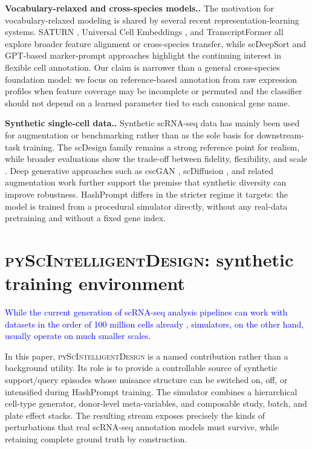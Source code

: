 \documentclass{article}
\newcommand{\myparagraph}[1]{\noindent\textbf{#1.} }
\newcommand{\phflo}[1]{\textcolor{blue}{#1}}
\begin{document}
\myparagraph{Vocabulary-relaxed and cross-species models.}
The motivation for vocabulary-relaxed modeling is shared by several recent representation-learning systems. SATURN \cite{saturn}, Universal Cell Embeddings \cite{uce}, and TranscriptFormer \cite{transcriptformer} all explore broader feature alignment or cross-species transfer, while scDeepSort \cite{shao2021scdeepsort} and GPT-based marker-prompt approaches \cite{hou2024assessing} highlight the continuing interest in flexible cell annotation. Our claim is narrower than a general cross-species foundation model: we focus on reference-based annotation from raw expression profiles when feature coverage may be incomplete or permuted and the classifier should not depend on a learned parameter tied to each canonical gene name.

\myparagraph{Synthetic single-cell data.}
Synthetic scRNA-seq data has mainly been used for augmentation or benchmarking rather than as the sole basis for downstream-task training. The scDesign family \cite{scdesign,scdesign2,scdesign3} remains a strong reference point for realism, while broader evaluations show the trade-off between fidelity, flexibility, and scale \cite{crowell2023shaky,duo2024systematic}. Deep generative approaches such as cscGAN \cite{marouf2020realistic}, scDiffusion \cite{luo2024scdiffusion}, and related augmentation work \cite{bej2021automated,nouri2025single} further support the premise that synthetic diversity can improve robustness. HashPrompt differs in the stricter regime it targets: the model is trained from a procedural simulator directly, without any real-data pretraining and without a fixed gene index.

\section{\textsc{pyScIntelligentDesign}: synthetic training environment}

\phflo{While the current generation of scRNA-seq analysis pipelines can work with datasets in the order of 100 million cells already \cite{wolf2018scanpy, zhang2025tahoe}, simulators, on the other hand, usually operate on much smaller scales. }

In this paper, \textsc{pyScIntelligentDesign} is a named contribution rather than a background utility. Its role is to provide a controllable source of synthetic support/query episodes whose nuisance structure can be switched on, off, or intensified during HashPrompt training. The simulator combines a hierarchical cell-type generator, donor-level meta-variables, and composable study, batch, and plate effect stacks. The resulting stream exposes precisely the kinds of perturbations that real scRNA-seq annotation models must survive, while retaining complete ground truth by construction.
\end{document}
